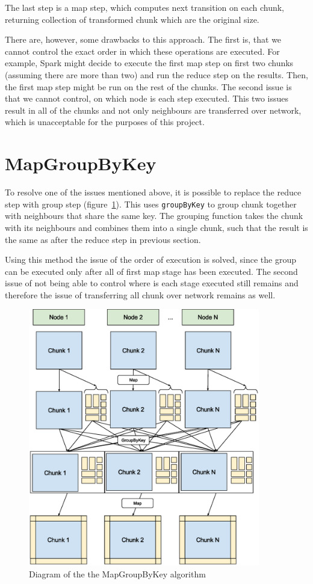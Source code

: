 \documentclass{l4proj}
\begin{document}
The last step is a map step, which computes next transition on each chunk, returning
collection of transformed chunk which are the original size.

There are, however, some drawbacks to this approach. The first is, that we cannot
control the exact order in which these operations are executed. For example, Spark
might decide to execute the first map step on first two chunks (assuming there are more than two)
and run the reduce step on the results. Then, the first map step might be run on the rest
of the chunks. The second issue is that we cannot control, on which node is each step 
executed. This two issues result in all of the chunks and not only neighbours are
transferred over network, which is unacceptable for the purposes of this project.

\section{MapGroupByKey}

To resolve one of the issues mentioned above, it is possible to replace the reduce
step with group step (figure~\ref{fig:map_group}). This uses \texttt{groupByKey} to group chunk together with
neighbours that share the same key. The grouping function takes the chunk with
its neighbours and combines them into a single chunk, such that the result is the
same as after the reduce step in previous section.

Using this method the issue of the order of execution is solved, since the group
can be executed only after all of first map stage has been executed. The second issue
of not being able to control where is each stage executed still remains and therefore
the issue of transferring all chunk over network remains as well.

\begin{figure}
\centering
\includegraphics[width=0.9\textwidth]{images/MapGroup.eps}
\caption{Diagram of the the MapGroupByKey algorithm}
\label{fig:map_group}
\end{figure}
\end{document}
